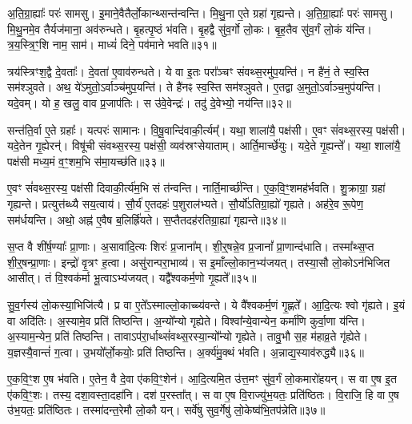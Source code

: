 अ॒ति॒ग्रा॒ह्याः᳚ परः॑ सामसु।
इ॒माने॒वैतैर्लो॒कान्थ्सन्त॑न्वन्ति।
मि॒थु॒ना ए॒ते ग्रहा॑ गृह्यन्ते।
अ॒ति॒ग्रा॒ह्याः᳚ परः॑ सामसु।
मि॒थु॒नमे॒व तैर्यज॑माना॒ अव॑रुन्धते।
बृ॒हत्पृ॒ष्ठं भ॑वति।
बृ॒हद्वै सु॑व॒र्गो लो॒कः।
बृ॒ह॒तैव सु॑व॒र्गं लो॒कं य॑न्ति।
त्र॒य॒स्त्रि॒ꣳ॒शि  नाम॒ साम॑।
माध्यं॑ दिने॒ पव॑माने भवति॥३१॥\ip

त्रय॑स्त्रिꣳश॒द्वै दे॒वताः᳚।
दे॒वता॑ ए॒वाव॑रुन्धते।
ये वा इ॒तः परा᳚ञ्चꣳ संवथ्स॒रमु॑प॒यन्ति॑।
न है॑नं॒ ते स्व॒स्ति सम॑श्ञुवते।
अथ॒ ये॑\-ऽमुतो॒\-ऽर्वाञ्च॑मुप॒यन्ति॑।
ते है॑नꣴ स्व॒स्ति सम॑श्ञुवते।
ए॒तद्वा अ॒मुतो॒\-ऽर्वाञ्च॒मुप॑यन्ति।
यदे॒वम्।
यो ह॒ खलु॒ वाव प्र॒जा\-प॑तिः।
स उ॑वे॒वेन्द्रः॑।
तदु॑ दे॒वेभ्यो॒ नय॑न्ति॥३२॥\ip\anuvakamend[का॒र्या॑ वि॒राड्गृ॑ह्यन्ते॒ पव॑माने भव॒तीन्द्र॒ एकं॑ च]

सन्त॑ति॒र्वा ए॒ते ग्रहाः᳚।
यत्परः॑ सामानः।
वि॒षू॒वान्दि॑वा\-की॒र्त्यम्᳚।
यथा॒ शाला॑यै॒ पक्ष॑सी।
ए॒वꣳ सं॑वथ्स॒रस्य॒ पक्ष॑सी।
यदे॒तेन गृ॒ह्येरन्॑।
विषू॑ची संवथ्स॒रस्य॒ पक्ष॑सी॒ व्यव॑स्रꣳसेयाताम्।
आर्ति॒मार्च्छे॑युः।
यदे॒ते गृ॒ह्यन्ते᳚।
यथा॒ शाला॑यै॒ पक्ष॑सी मध्य॒मं व॒ꣳ॒शम॒भि स॑मा॒यच्छ॑ति॥३३॥\ip

ए॒वꣳ सं॑वथ्स॒रस्य॒ पक्ष॑सी दिवाकी॒र्त्य॑म॒भि सं त॑न्वन्ति।
नार्ति॒मार्च्छ॑न्ति।
ए॒क॒वि॒ꣳ॒शमह॑र्भवति।
शु॒क्राग्रा॒ ग्रहा॑ गृह्यन्ते।
प्रत्युत्त॑ब्ध्यै सय॒त्वाय॑।
सौ॒र्य॑ ए॒तदहः॑ प॒शुराल॑भ्यते।
सौ॒र्यो॑\-ऽतिग्रा॒ह्यो॑ गृह्यते।
अह॑रे॒व रू॒पेण॒ सम॑र्धयन्ति।
अथो॒ अह्न॑ ए॒वैष ब॒लिर्\mbox{}ह्रि॑यते।
स॒प्तैतदह॑रतिग्रा॒ह्या॑ गृह्यन्ते॥३४॥\ip

स॒प्त वै शी॑र्\mbox{}ष॒ण्याः᳚ प्रा॒णाः।
अ॒सावा॑दि॒त्यः शिरः॑ प्र॒जाना᳚म्।
शी॒र्॒षन्ने॒व प्र॒जानां᳚ प्रा॒णान्द॑धाति।
तस्मा᳚थ्स॒प्त शी॒र्॒षन्प्रा॒णाः।
इन्द्रो॑ वृ॒त्रꣳ ह॒त्वा।
असु॑रान्परा॒भाव्य॑।
स इ॒माँल्लो॒कान॒भ्य॑जयत्।
तस्या॒सौ लो॒को\-ऽन॑भिजित आसीत्।
तं वि॒श्वक॑र्मा भू॒त्वा\-ऽभ्य॑जयत्।
यद्वै᳚श्वकर्म॒णो गृ॒ह्यते᳚॥३५॥\ip

सु॒व॒र्गस्य॑ लो॒कस्या॒भिजि॑त्यै।
प्र वा ए॒ते᳚\-ऽस्माल्लो॒काच्च्य॑वन्ते।
ये वै᳚श्वकर्म॒णं गृ॒ह्णते᳚।
आ॒दि॒त्यः श्वो गृ॑ह्यते।
इ॒यं वा अदि॑तिः।
अ॒स्यामे॒व प्रति॑ तिष्ठन्ति।
अ॒न्यो᳚न्यो गृह्येते।
विश्वा᳚न्ये॒वान्येन॒ कर्मा॑णि कुर्वा॒णा य॑न्ति।
अ॒स्याम॒न्येन॒ प्रति॑ तिष्ठन्ति।
तावाऽप॑रा॒र्धाथ्सं॑वथ्स॒रस्या॒न्यो᳚न्यो गृह्येते।
तावु॒भौ स॒ह म॑हाव्र॒ते गृ॑ह्येते।
य॒ज्ञस्यै॒वान्तं॑ ग॒त्वा।
उ॒भयो᳚र्लो॒कयोः॒ प्रति॑ तिष्ठन्ति।
अ॒र्क्य॑मु॒क्थं भ॑वति।
अ॒न्नाद्य॒स्या\-व॑\-रुद्ध्यै॥३६॥\ip\anuvakamend[स॒मा॒यच्छ॑त्यतिग्रा॒ह्या॑ गृह्यन्ते गृ॒ह्यते॑ संवथ्स॒रस्या॒न्यो᳚न्यो गृह्येते॒ पञ्च॑ च]

ए॒क॒वि॒ꣳ॒श ए॒ष भ॑वति।
ए॒तेन॒ वै दे॒वा ए॑कवि॒ꣳ॒शेन॑।
आ॒दि॒त्यमि॒त उ॑त्त॒मꣳ सु॑व॒र्गं लो॒कमारो॑हयन्।
स वा ए॒ष इ॒त ए॑कवि॒ꣳ॒शः।
तस्य॒ दशा॒वस्ता॒दहा॑नि।
दश॑ प॒रस्ता᳚त्।
स वा ए॒ष वि॒राज्यु॑भ॒यतः॒ प्रति॑\-ष्ठितः।
वि॒राजि॒ हि वा ए॒ष उ॑भ॒यतः॒ प्रति॑\-ष्ठितः।
तस्मा॑दन्त॒रेमौ लो॒कौ यन्।
सर्वे॑षु सुव॒र्गेषु॑ लो॒केष्व॑भि॒तप॑न्नेति॥३७॥\ip

